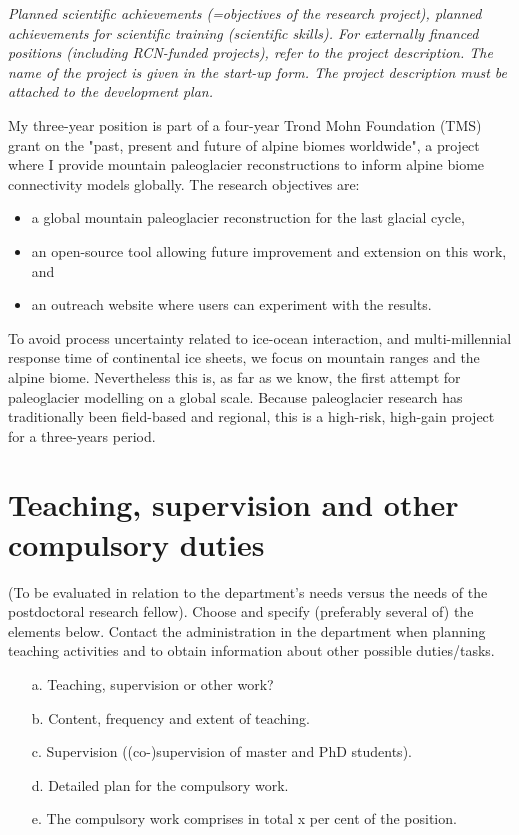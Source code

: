 \documentclass{article}
\newcommand{\guideline}[1]{{\color{color2}\itshape{#1}}}
\begin{document}
    \guideline{
        Planned scientific achievements (=objectives of the research project),
        planned achievements for scientific training (scientific skills). For
        externally financed positions (including RCN-funded projects), refer to
        the project description. The name of the project is given in the
        start-up form.  The project description must be attached to the
        development plan.}

    My three-year position is part of a four-year Trond Mohn Foundation (TMS)
    grant on the "past, present and future of alpine biomes worldwide", a
    project where I provide mountain paleoglacier reconstructions to inform
    alpine biome connectivity models globally. The research objectives are:

    \begin{itemize}
      \item a global mountain paleoglacier reconstruction for the last glacial
        cycle,
      \item an open-source tool allowing future improvement and extension on
        this work, and
      \item an outreach website where users can experiment with the results.
    \end{itemize}

    To avoid process uncertainty related to ice-ocean interaction, and
    multi-millennial response time of continental ice sheets, we focus on
    mountain ranges and the alpine biome. Nevertheless this is, as far as we
    know, the first attempt for paleoglacier modelling on a global scale.
    Because paleoglacier research has traditionally been field-based and
    regional, this is a high-risk, high-gain project for a three-years period.


\section{Teaching, supervision and other compulsory duties}

    \guideline{
        (To be evaluated in relation to the department’s needs versus the needs
        of the postdoctoral research fellow). Choose and specify (preferably
        several of) the elements below. Contact the administration in the
        department when planning teaching activities and to obtain information
        about other possible duties/tasks.

        \begin{itemize}
          \item[a.] Teaching, supervision or other work?
          \item[b.] Content, frequency and extent of teaching.
          \item[c.] Supervision ((co-)supervision of master and PhD students).
          \item[d.] Detailed plan for the compulsory work.
          \item[e.] The compulsory work comprises in total x per cent of the position.
        \end{itemize}}
\end{document}
